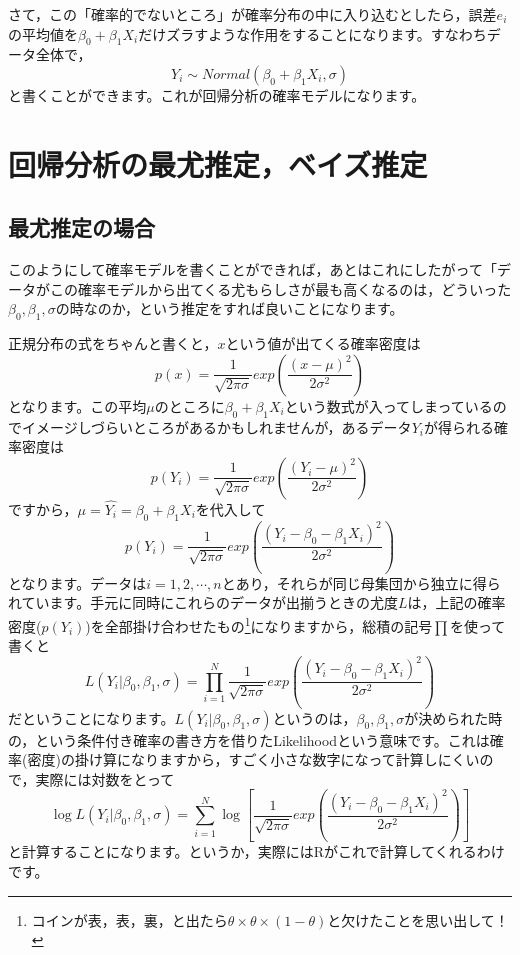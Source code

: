 \documentclass{ltjsarticle}
\begin{document}
さて，この「確率的でないところ」が確率分布の中に入り込むとしたら，誤差$e_i$の平均値を$\beta_0 + \beta_1 X_i$だけズラすような作用をすることになります。すなわちデータ全体で，
\[ Y_i \sim Normal(\beta_0 + \beta_1 X_i , \sigma) \]
と書くことができます。これが回帰分析の確率モデルになります。

\section{回帰分析の最尤推定，ベイズ推定}
\subsection{最尤推定の場合}
このようにして確率モデルを書くことができれば，あとはこれにしたがって「データがこの確率モデルから出てくる尤もらしさが最も高くなるのは，どういった$\beta_0, \beta_1, \sigma$の時なのか，という推定をすれば良いことになります。

正規分布の式をちゃんと書くと，$x$という値が出てくる確率密度は
\[ p(x) = \frac{1}{\sqrt{2\pi \sigma}}exp\left( \frac{(x-\mu)^2}{2\sigma^2}\right)\]
となります。この平均$\mu$のところに$\beta_0 + \beta_1 X_i$という数式が入ってしまっているのでイメージしづらいところがあるかもしれませんが，あるデータ$Y_i$が得られる確率密度は
\[ p(Y_i) = \frac{1}{\sqrt{2\pi \sigma}}exp\left( \frac{(Y_i-\mu)^2}{2\sigma^2}\right)\]
ですから，$\mu=\hat{Y_i} = \beta_0 + \beta_1 X_i$を代入して
\[ p(Y_i) = \frac{1}{\sqrt{2\pi \sigma}}exp\left( \frac{(Y_i-\beta_0 - \beta_1 X_i)^2}{2\sigma^2}\right)\]
となります。データは$i = 1,2,\cdots,n$とあり，それらが同じ母集団から独立に得られています。手元に同時にこれらのデータが出揃うときの尤度$L$は，上記の確率密度($p(Y_i)$)を全部掛け合わせたもの\footnote{コインが表，表，裏，と出たら$\theta \times \theta \times (1-\theta)$と欠けたことを思い出して！}になりますから，総積の記号$\prod$を使って書くと
\[ L(Y_i | \beta_0,\beta_1,\sigma) = \prod_{i=1}^N \frac{1}{\sqrt{2\pi \sigma}}exp\left( \frac{(Y_i-\beta_0 - \beta_1 X_i)^2}{2\sigma^2}\right)\]
だということになります。$L(Y_i | \beta_0,\beta_1,\sigma) $というのは，$\beta_0,\beta_1,\sigma$が決められた時の，という条件付き確率の書き方を借りたLikelihoodという意味です。これは確率(密度)の掛け算になりますから，すごく小さな数字になって計算しにくいので，実際には対数をとって
\[ \log L(Y_i | \beta_0,\beta_1,\sigma) = \sum_{i=1}^N \log \left[ \frac{1}{\sqrt{2\pi \sigma}}exp\left( \frac{(Y_i-\beta_0 - \beta_1 X_i)^2}{2\sigma^2}\right)\right]\]
と計算することになります。というか，実際にはRがこれで計算してくれるわけです。
\end{document}
